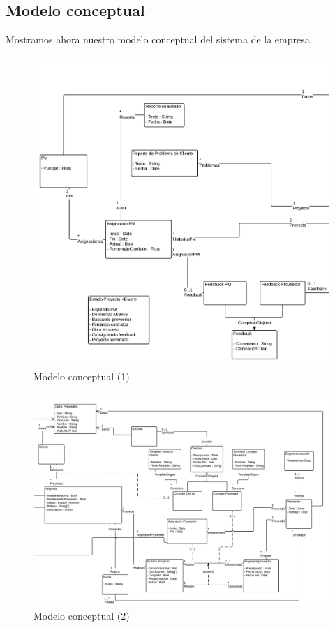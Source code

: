 \subsection{Modelo conceptual}

Mostramos ahora nuestro modelo conceptual del sistema de la empresa. 

\begin{figure}[H]
\includegraphics[width=\linewidth]{diag/nuevos/concept2.png}
\caption{Modelo conceptual (1)}
\label{concept1}
\end{figure}

\begin{figure}[H]
\includegraphics[width=\linewidth]{diag/nuevos/concept1.png}
\caption{Modelo conceptual (2)}
\label{concept2}
\end{figure}

